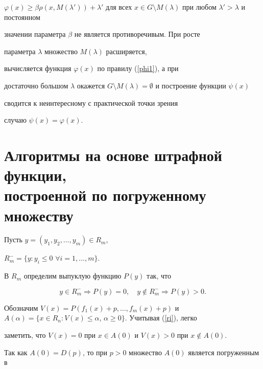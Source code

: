 $\varphi(x)\geq\beta\rho(x,M(\lambda'))+\lambda'$ для всех $x\in


G\setminus M(\lambda)$ при любом $\lambda'>\lambda$ и постоянном


значении параметра $\beta$ не является противоречивым. При росте


параметра $\lambda$ множество $M(\lambda)$ расширяется,


вычисляется функция $\varphi(x)$ по правилу (\ref{phi1}), а при


достаточно большом $\lambda$ окажется $G\setminus


M(\lambda)=\emptyset$ и построение функции $\psi(x)$


сводится к неинтересному с практической точки зрения


случаю $\psi(x)=\varphi(x)$.








\section{Алгоритмы на основе штрафной функции, \protect\\


построенной по погруженному множеству}





Пусть $y=(y_1,y_2,\dotsc,y_m)\in R_m$,


$R_m^-=\{y: y_i\leq 0$ $\forall i=1,\dotsc,m\}$. 


В $R_m$ определим выпуклую функцию $P(y)$ так, что


\begin{equation}\label{ri}


y\in R_m^-\Longrightarrow P(y)=0,\quad


y\notin R_m^-\Longrightarrow P(y)>0.


\end{equation}





Обозначим $V(x)=P(f_1(x)+p,\dotsc,f_m(x)+p)$ и $A(\alpha)=\{x\in


R_n: V(x)\leq \alpha$, $\alpha\geq 0\}$. Учитывая (\ref{ri}), легко


заметить, что $V(x)=0$ при $x\in A(0)$ и $V(x)>0$ при $x\notin A(0)$.





Так как $A(0)=D(p)$, то при $p>0$ множество $A(0)$ является погруженным в


